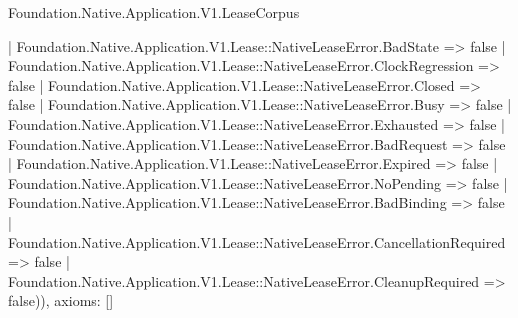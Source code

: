 \begin{lexlean}{Foundation.Native.Application.V1.LeaseCorpus}
\begin{semanticmodule}
{      | Foundation.Native.Application.V1.Lease::NativeLeaseError.BadState => false
      | Foundation.Native.Application.V1.Lease::NativeLeaseError.ClockRegression => false
      | Foundation.Native.Application.V1.Lease::NativeLeaseError.Closed => false
      | Foundation.Native.Application.V1.Lease::NativeLeaseError.Busy => false
      | Foundation.Native.Application.V1.Lease::NativeLeaseError.Exhausted => false
      | Foundation.Native.Application.V1.Lease::NativeLeaseError.BadRequest => false
      | Foundation.Native.Application.V1.Lease::NativeLeaseError.Expired => false
      | Foundation.Native.Application.V1.Lease::NativeLeaseError.NoPending => false
      | Foundation.Native.Application.V1.Lease::NativeLeaseError.BadBinding => false
      | Foundation.Native.Application.V1.Lease::NativeLeaseError.CancellationRequired => false
      | Foundation.Native.Application.V1.Lease::NativeLeaseError.CleanupRequired => false)),
  axioms: []
}


\end{semanticmodule}
\end{lexlean}
